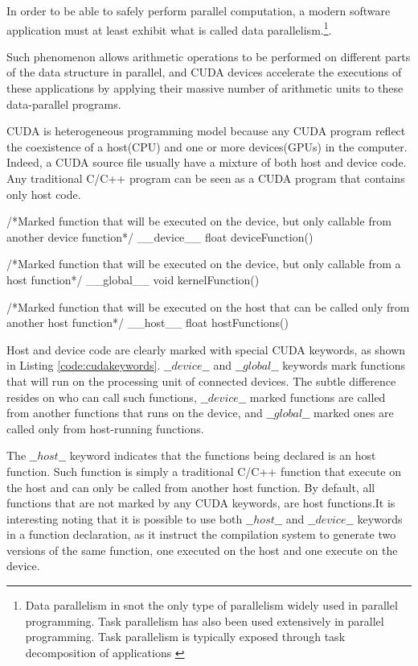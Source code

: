 \documentclass[12pt,a4paper]{extarticle}
\newcommand{\linespace}{\vspace{8pt}}
\begin{document}
In order to be able to safely perform parallel computation, a modern software application must at least exhibit what is called data parallelism.\footnote{Data parallelism in snot the only type of parallelism widely used in parallel programming. Task parallelism has also been used extensively in parallel programming. Task parallelism is typically exposed through task decomposition of applications  \cite{KirkHwu_2014:3}}.

Such phenomenon allows arithmetic operations to be performed on different parts of the data structure in parallel, and CUDA devices accelerate the executions of these applications by applying their massive number of arithmetic units to these data-parallel programs.
\linespace

CUDA is heterogeneous programming model because any CUDA program reflect the coexistence of a host(CPU) and one or more devices(GPUs) in the computer. Indeed, a CUDA source file usually have a mixture of both host and device code.
Any traditional C/C++ program can be seen as a CUDA program that contains only host code.

\begin{cpp}[caption={CUDA keywords for function declarations},label=code:cudakeywords]
/*Marked function that will be executed on the device, but only 
	callable from another device function*/
__device__ float deviceFunction()

/*Marked function that will be executed on the device, but only 
	callable from a host function*/
__global__ void kernelFunction()

/*Marked function that will be executed on the host that can be 
	called only from another host function*/
__host__ float hostFunctions()
\end{cpp}


Host and device code are clearly marked with special CUDA keywords, as shown in Listing \ref{code:cudakeywords}. $\_\_device\_\_$ and $\_\_global\_\_$ keywords mark functions that will run on the processing unit of connected devices. The subtle difference resides on who can call such functions, $\_\_device\_\_$ marked functions are called from another functions that runs on the device, and $\_\_global\_\_$ marked ones are called only from host-running functions. 
\linespace

The $\_\_host\_\_$ keyword indicates that the functions being declared is an host function. Such function is simply a traditional C/C++ function that execute on the host and can only be called from another host function. By default, all functions that are not marked by any CUDA keywords, are host functions.It is interesting noting that it is possible to use both $\_\_host\_\_$ and $\_\_device\_\_$ keywords in a function declaration, as it instruct the compilation system to generate two versions of the same function, one executed on the host and one execute on the device.
\linespace
\end{document}
